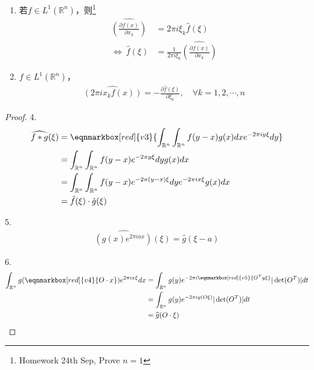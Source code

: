 \begin{proposition}
\begin{enumerate}[leftmargin=1cm, label=\arabic*]
        \item 若$f\in L^1(\mathbb{R}^n)$，则\footnote{Homework 24th Sep, Prove $n=1$}
        \begin{align*}
            \widehat{\left(\frac{\partial f(x)}{\partial x_k}\right)} &= 2\pi i \xi_k \hat{f}(\xi) \\
            \Longleftrightarrow\ \hat{f}(\xi) &= \frac{1}{2\pi i \xi_k} \widehat{\left(\frac{\partial f(x)}{\partial x_k}\right)}
        \end{align*}

        \item $f\in L^1(\mathbb{R}^n)$，
        \begin{align*}
            \widehat{(2\pi i x_k f(x))} = -\frac{\partial \hat{f}(\xi)}{\partial \xi_k},\quad \forall k=1,2,\cdots,n
        \end{align*}
        
    \end{enumerate}
\end{proposition}

\newpage
\begin{proof}
    4.
    \begin{align*}
        \widehat{f*g}(\xi) & = \eqnmarkbox[red]{v3}{\int_{\mathbb{R}^n} \int_{\mathbb{R}^n} f(y-x)g(x) dx e^{-2\pi i y \xi} dy} \\
        & = \int_{\mathbb{R}^n} \int_{\mathbb{R}^n} f(y-x) e^{-2\pi y\xi} dy g(x) dx \\
        & = \int_{\mathbb{R}^n} \int_{\mathbb{R}^n} f(y-x) e^{-2\pi (y-x)\xi} dy e^{-2\pi i x\xi} g(x) dx \\
        & = \hat{f}(\xi)\cdot \hat{g}(\xi)
    \end{align*}

    5.
    \begin{align*}
        \widehat{(g(x) e^{2\pi i a x})}(\xi) = \widehat{g}(\xi - a)
    \end{align*}

    6.
    \begin{align*}
        \int_{\mathbb{R}^n} g(\eqnmarkbox[red]{v4}{O\cdot x}) e^{2\pi i x \xi} dx & = \int_{\mathbb{R}^n} g(y) e^{-2\pi i \eqnmarkbox[red]{v5}{O^T y \xi}} |\operatorname{det}(O^T)| dt \\
        & = \int_{\mathbb{R}^n} g(y) e^{-2\pi i y (O\xi)} |\operatorname{det}(O^T)| dt \\
        & = \widehat{g}(O\cdot \xi) 
    \end{align*}
\end{proof}

